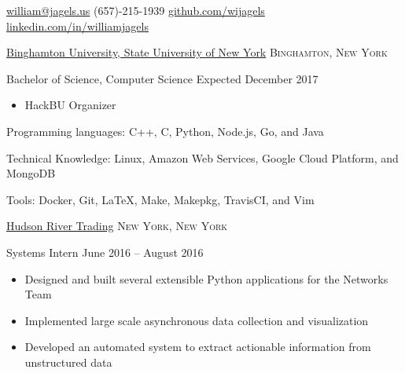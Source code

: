 \documentclass[11pt]{article}
\begin{document}


\nobreakvspace{0.3em}  %

\href{mailto:william@jagels.us}{william@jagels.us}\sbull
(657)-215-1939\sbull
\href{https://github.com/wijagels}{github.com/wijagels}\sbull
\href{https://www.linkedin.com/in/williamjagels}{linkedin.com/in/williamjagels}


\spacedhrule{0.1em}{0.9em}  %

\headedsection
{\href{http://www.binghamton.edu/index.php}{Binghamton University, State University of New York}}
{\textsc{Binghamton, New York}} {
    \headedsubsection
    {Bachelor of Science, Computer Science}
    {Expected December 2017}
    {
        \begin{itemize}
            \item HackBU Organizer
        \end{itemize}
    }
}



\spacedhrule{0.1em}{0.9em}  %

\inlineheadsection  %
{Programming languages:}
{C++, C, Python, Node.js, Go, and Java}


\inlineheadsection
{Technical Knowledge:}
{Linux, Amazon Web Services, Google Cloud Platform, and MongoDB}

\inlineheadsection
{Tools:}
{Docker, Git, \LaTeX, Make, Makepkg, TravisCI, and Vim}




\spacedhrule{0.1em}{0.9em}  %

\headedsection
{\href{http://www.hudson-trading.com/}{Hudson River Trading}}
{\textsc{New York, New York}} {
  \headedsubsection
  {Systems Intern}
  {June 2016 -- August 2016}
  {
    \begin{itemize}
      \item Designed and built several extensible Python applications for the Networks Team
      \item Implemented large scale asynchronous data collection and visualization
      \item Developed an automated system to extract actionable information from unstructured data
    \end{itemize}
  }
}
\end{document}
